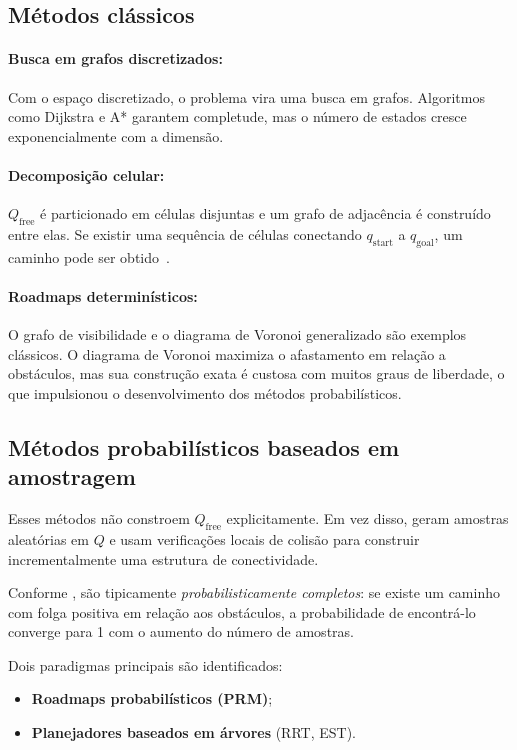 \subsection{Métodos clássicos}

\paragraph{Busca em grafos discretizados:}
Com o espaço discretizado, o problema vira uma busca em grafos. Algoritmos como Dijkstra e A* garantem completude, mas o número de estados cresce exponencialmente com a dimensão.

\paragraph{Decomposição celular:}
$Q_{\mathrm{free}}$ é particionado em células disjuntas e um grafo de adjacência é construído entre elas. Se existir uma sequência de células conectando $q_{\mathrm{start}}$ a $q_{\mathrm{goal}}$, um caminho pode ser obtido~\cite{choset2005principles}.

\paragraph{Roadmaps determinísticos:}
O grafo de visibilidade e o diagrama de Voronoi generalizado são exemplos clássicos. O diagrama de Voronoi maximiza o afastamento em relação a obstáculos, mas sua construção exata é custosa com muitos graus de liberdade, o que impulsionou o desenvolvimento dos métodos probabilísticos.

\subsection{Métodos probabilísticos baseados em amostragem}

Esses métodos não constroem $Q_{\mathrm{free}}$ explicitamente. Em vez disso, geram amostras aleatórias em $Q$ e usam verificações locais de colisão para construir incrementalmente uma estrutura de conectividade.

Conforme \citet{choset2005principles}, são tipicamente \textit{probabilisticamente completos}: se existe um caminho com folga positiva em relação aos obstáculos, a probabilidade de encontrá-lo converge para 1 com o aumento do número de amostras.

Dois paradigmas principais são identificados:

\begin{itemize}
    \item \textbf{Roadmaps probabilísticos (PRM)};
    \item \textbf{Planejadores baseados em árvores} (RRT, EST).
\end{itemize}


